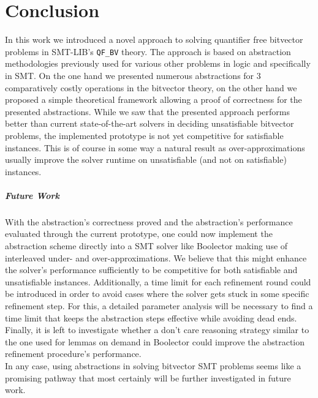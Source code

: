 \chapter{Conclusion}
\label{ch:Conclusion}
In this work we introduced a novel approach to solving quantifier free bitvector problems in SMT-LIB's \texttt{QF\_BV} theory. The approach is based on abstraction methodologies previously used for various other problems in logic and specifically in SMT.
On the one hand we presented numerous abstractions for 3 comparatively costly operations in the bitvector theory, on the other hand we proposed a simple theoretical framework allowing a proof of correctness for the presented abstractions.
While we saw that the presented approach performs better than current state-of-the-art solvers in deciding unsatisfiable bitvector problems, the implemented prototype is not yet competitive for satisfiable instances. This is of course in some way a natural result as over-approximations usually improve the solver runtime on unsatisfiable (and not on satisfiable) instances.

\paragraph{Future Work}
With the abstraction's correctness proved and the abstraction's performance evaluated through the current prototype, one could now implement the abstraction scheme directly into a SMT solver like Boolector making use of interleaved under- and over-approximations. We believe that this might enhance the solver's performance sufficiently to be competitive for both satisfiable and unsatisfiable instances.
Additionally, a time limit for each refinement round could be introduced in order to avoid cases where the solver gets stuck in some specific refinement step. For this, a detailed parameter analysis will be necessary to find a time limit that keeps the abstraction steps effective while avoiding dead ends. Finally, it is left to investigate whether a don't care reasoning strategy similar to the one used for lemmas on demand in Boolector \cite{NiemetzPreinerBiere-FMCAD14} could improve the abstraction refinement procedure's performance.\\
In any case, using abstractions in solving bitvector SMT problems seems like a promising pathway that most certainly will be further investigated in future work.